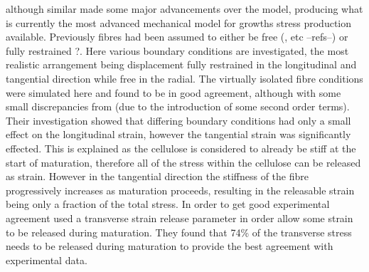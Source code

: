 \cite{Alm_ras_2005}
although similar made some major advancements over the \cite{Yamamoto_1998} model,
producing what is currently the most advanced mechanical model for growths
stress production available. Previously fibres had been assumed to either be
free (\cite{Yamamoto_1998}, etc --refs--) or fully restrained \cite{archer1987}\cite{archer1989}?. Here
various boundary conditions are investigated, the most realistic arrangement being
displacement fully restrained in the longitudinal and tangential direction while
free in the radial. The virtually isolated fibre conditions were simulated here
and found to be in good agreement, although with some small discrepancies from
\cite{Yamamoto_1998} (due to the introduction of some second order terms).  Their
investigation showed that differing boundary conditions had only a small effect
on the longitudinal strain, however the tangential strain was significantly
effected. This is explained as the cellulose is considered to already be stiff at
the start of maturation, therefore all of the stress within the cellulose can be
released as strain. However in the tangential direction the stiffness of the
fibre progressively increases as maturation proceeds, resulting in the
releasable strain being only a fraction of the total stress. In order to get good
experimental agreement \cite{Alm_ras_2005} used a transverse strain release
parameter in order allow some strain to be released during maturation. They
found that 74\% of the transverse stress needs to be released during maturation
to provide the best agreement with experimental data.
